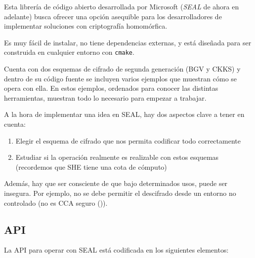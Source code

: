Esta librería de código abierto desarrollada por Microsoft (\textit{SEAL} de ahora en adelante) busca ofrecer una opción asequible para los desarrolladores de implementar soluciones con criptografía homomórfica.

Es muy fácil de instalar, no tiene dependencias externas, y está diseñada para ser construida en cualquier entorno con \verb|cmake|.

Cuenta con dos esquemas de cifrado de segunda generación (BGV y CKKS) y dentro de su código fuente se incluyen varios ejemplos que muestran cómo se opera con ella. En estos ejemplos, ordenados para conocer las distintas herramientas, muestran todo lo necesario para empezar a trabajar.

A la hora de implementar una idea en SEAL, hay dos aspectos clave a tener en cuenta:

\begin{enumerate}
  \item Elegir el esquema de cifrado que nos permita codificar todo correctamente
  \item Estudiar si la operación realmente es realizable con estos esquemas (recordemos que SHE tiene una cota de cómputo)
\end{enumerate}

Además, hay que ser consciente de que bajo determinados usos, puede ser insegura. Por ejemplo, no se debe permitir el descifrado desde un entorno no controlado (no es CCA seguro (\cite{peng_danger_2019})).

\subsection{API}

La API para operar con SEAL está codificada en los siguientes elementos:

